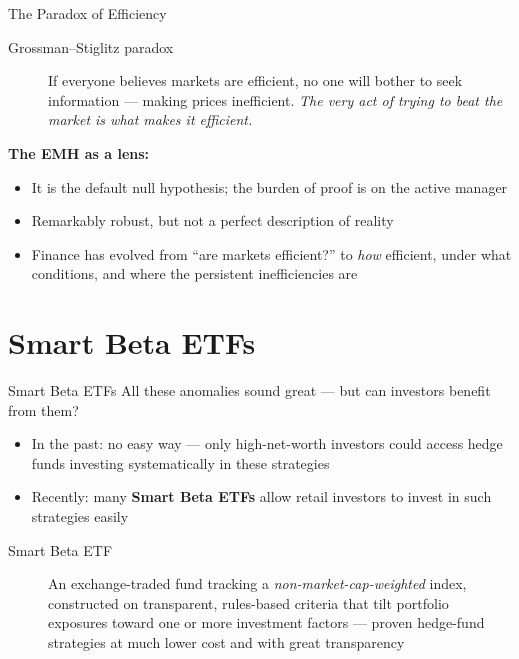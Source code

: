 \documentclass[aspectratio=169]{beamer}
\begin{document}
\begin{frame}{The Paradox of Efficiency}
\begin{description}
  \item[Grossman--Stiglitz paradox] If everyone believes markets are efficient, no one will bother to seek information --- making prices inefficient. \emph{The very act of trying to beat the market is what makes it efficient.}
\end{description}
\vspace{0.3em}
\textbf{The EMH as a lens:}
\begin{itemize}
  \item It is the default null hypothesis; the burden of proof is on the active manager
  \item Remarkably robust, but not a perfect description of reality
  \item Finance has evolved from ``are markets efficient?'' to \emph{how} efficient, under what conditions, and where the persistent inefficiencies are
\end{itemize}
\end{frame}


\section{Smart Beta ETFs}

\begin{frame}{Smart Beta ETFs}
All these anomalies sound great --- but can investors benefit from them?
\begin{itemize}
  \item In the past: no easy way --- only high-net-worth investors could access hedge funds investing systematically in these strategies
  \item Recently: many \textbf{Smart Beta ETFs} allow retail investors to invest in such strategies easily
\end{itemize}
\vspace{0.3em}
\begin{description}
  \item[Smart Beta ETF] An exchange-traded fund tracking a \emph{non-market-cap-weighted} index, constructed on transparent, rules-based criteria that tilt portfolio exposures toward one or more investment factors --- proven hedge-fund strategies at much lower cost and with great transparency
\end{description}
\end{frame}
\end{document}
